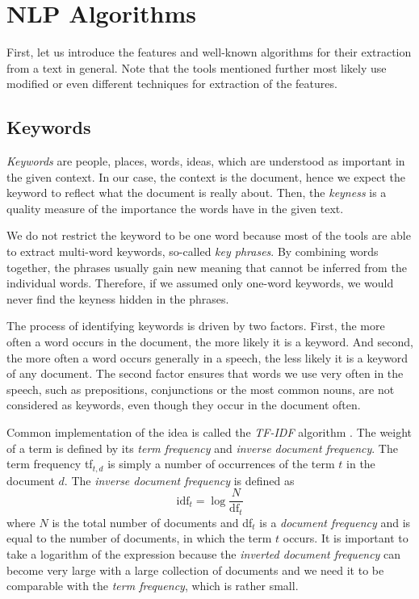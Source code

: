 \documentclass[
  digital, %
  table,   %
  lof,     %
  lot,     %
]{fithesis3}
\begin{document}
\section{NLP Algorithms}
First, let us introduce the features and well-known algorithms for their extraction from a text in general.
Note that the tools mentioned further most likely use modified or even different techniques for extraction of the features.

\subsection{Keywords}
\label{algorithms_keywords}
\emph{Keywords} are people, places, words, ideas, which are understood as important in the given context. 
In our case, the context is the document, hence we expect the keyword to reflect what the document is really about.
Then, the \textit{keyness} is a quality measure of the importance the words have in the given text.
\cite[ch. 4]{scott2006textual}

We do not restrict the keyword to be one word because most of the tools are able to extract multi-word keywords, so-called \textit{key phrases}.
By combining words together, the phrases usually gain new meaning that cannot be inferred from the individual words.
Therefore, if we assumed only one-word keywords, we would never find the keyness hidden in the phrases.

The process of identifying keywords is driven by two factors.
First, the more often a word occurs in the document, the more likely it is a keyword.
And second, the more often a word occurs generally in a speech, the less likely it is a keyword of any document.
\cite[ch. 4]{scott2006textual}
The second factor ensures that words we use very often in the speech, such as prepositions, conjunctions or the most common nouns, are not considered as keywords, even though they occur in the document often.

Common implementation of the idea is called the \textit{TF-IDF} algorithm \cite[ch. 6]{manning2008introduction}.
The weight of a term is defined by its \textit{term frequency} and \textit{inverse document frequency}.
The term frequency tf$_{t,d}$ is simply a number of occurrences of the term $t$ in the document $d$. The \textit{inverse document frequency} is defined as
$$
\text{idf}_t = \log{\frac{N}{\text{df}_t}}
$$
where $N$ is the total number of documents and df$_{t}$ is a \textit{document frequency} and is equal to the number of documents, in which the term $t$ occurs.
It is important to take a logarithm of the expression because the \textit{inverted document frequency} can become very large with a large collection of documents and we need it to be comparable with the \textit{term frequency}, which is rather small.
\end{document}
